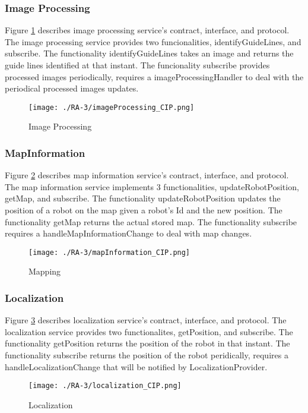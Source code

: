 \subsubsection{Image Processing} %
Figure \ref{fig:imageprocessing_cip} describes image processing service's contract, interface, and protocol. The image processing service provides two funcionalities, identifyGuideLines, and subscribe. The functionality identifyGuideLines takes an image and returns the guide lines identified at that instant. The funcionality subscribe provides processed images periodically, requires a imageProcessingHandler to deal with the periodical processed images updates. 
\begin{figure}[ht!]
 \centering
 \texttt{[image: ./RA-3/imageProcessing\_CIP.png]}
 \caption{Image Processing}
 \label{fig:imageprocessing_cip}
\end{figure}

\subsubsection{MapInformation} %
Figure \ref{fig:mapinformation_CIP} describes map information service's contract, interface, and protocol. The map information service implements 3 functionalities, updateRobotPosition, getMap, and subscribe. The functionality updateRobotPosition updates the position of a robot on the map given a robot's Id and the new position. The functionality getMap returns the actual stored map. The functionality subscribe requires a handleMapInformationChange to deal with map changes.
\begin{figure}[ht!]
 \centering
 \texttt{[image: ./RA-3/mapInformation\_CIP.png]}
 \caption{Mapping}
 \label{fig:mapinformation_CIP}
\end{figure}

\subsubsection{Localization} %
Figure \ref{fig:localization_cip} describes localization service's contract, interface, and protocol. The localization service provides two functionalites, getPosition, and subscribe. The functionality getPosition returns the position of the robot in that instant. The functionality subscribe returns the position of the robot peridically, requires a handleLocalizationChange that will be notified by LocalizationProvider.
\begin{figure}[ht!]
 \centering
 \texttt{[image: ./RA-3/localization\_CIP.png]}
 \caption{Localization}
 \label{fig:localization_cip}
\end{figure}

